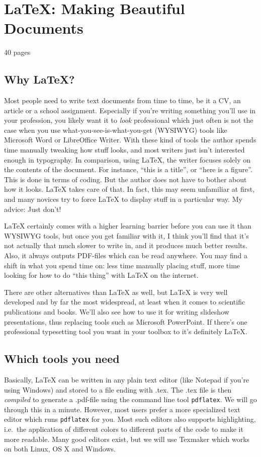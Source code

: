 \chapter{\LaTeX: Making Beautiful Documents}\label{ch:latex}
40 pages

\section{Why \LaTeX?}
Most people need to write text documents from time to time, be it a CV, an article or a school assignment. Especially if you're writing something you'll use in your profession, you likely want it to \emph{look} professional which just often is not the case when you use what-you-see-is-what-you-get (WYSIWYG) tools like Microsoft Word or LibreOffice Writer. With these kind of tools the author spends time manually tweaking how stuff looks, and most writers just isn't interested enough in typography. In comparison, using \LaTeX{}, the writer focuses solely on the contents of the document. For instance, ``this is a title'', or ``here is a figure''. This is done in terms of coding. But the author does not have to bother about how it looks. \LaTeX{} takes care of that. In fact, this may seem unfamiliar at first, and many novices try to force \LaTeX{} to display stuff in a particular way. My advice: Just don't!

\LaTeX{} certainly comes with a higher learning barrier before you can use it than WYSIWYG tools, but once you get familiar with it, I think you'll find that it's not actually that much slower to write in, and it produces much better results. Also, it always outputs PDF-files which can be read anywhere. You may find a shift in what you spend time on: less time manually placing stuff, more time looking for how to do ``this thing'' with \LaTeX{} on the internet.

There are other alternatives than \LaTeX{} as well, but \LaTeX{} is very well developed and by far the most widespread, at least when it comes to scientific publications and books. We'll also see how to use it for writing slideshow presentations, thus replacing tools such as Microsoft PowerPoint. If there's one professional typesetting tool you want in your toolbox to it's definitely \LaTeX{}.

\section{Which tools you need}
Basically, \LaTeX{} can be written in any plain text editor (like Notepad if you're using Windows) and stored to a file ending with .tex. The .tex file is then \emph{compiled} to generate a .pdf-file using the command line tool \texttt{pdflatex}. We will go through this in a minute. However, most users prefer a more specialized text editor which runs \texttt{pdflatex} for you. Most such editors also supports highlighting, i.e.\ the application of different colors to different parts of the code to make it more readable. Many good editors exist, but we will use Texmaker which works on both Linux, OS X and Windows.

